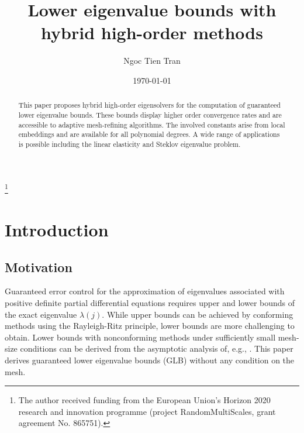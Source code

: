 \documentclass[a4paper]{amsart}
\numberwithin{equation}{section}
\theoremstyle{remark}
\theoremstyle{definition}
\theoremstyle{assumptionnoperiod}
\begin{document}
\title[Lower eigenvalue bounds with hybrid high-order methods]{Lower eigenvalue bounds with hybrid high-order methods}
\author[N.~T.~Tran]
       {Ngoc Tien Tran}
\thanks{The author received funding from
		the European Union's Horizon 2020 research and innovation 
		programme (project RandomMultiScales, grant agreement No. 865751).}
\address[N.~T.~Tran]{%
         Institut f\"ur Mathematik,
         Universit\"at Augsburg,
         86159 Augsburg, Germany}
\date{\today}




\begin{abstract}
	This paper proposes hybrid high-order eigensolvers for the computation of guaranteed lower eigenvalue bounds. These bounds display higher order convergence rates and are accessible to adaptive mesh-refining algorithms. The involved constants arise from local embeddings and are available for all polynomial degrees. A wide range of applications is possible including the linear
	elasticity and Steklov eigenvalue problem.
\end{abstract}
%	
\maketitle
\section{Introduction}
\subsection{Motivation}
Guaranteed error control for the approximation of eigenvalues associated with positive definite
partial differential equations requires upper and lower bounds of the exact eigenvalue $\lambda(j)$. While upper bounds can be achieved by conforming methods using the Rayleigh-Ritz principle, lower bounds are more challenging to obtain.
Lower bounds with nonconforming methods under sufficiently small mesh-size conditions can be derived from the asymptotic analysis of, e.g., \cite{YangZhangLin2010,LuoLinXie2012}.
This paper derives guaranteed lower eigenvalue bounds (GLB) without any condition on the mesh.
\end{document}

